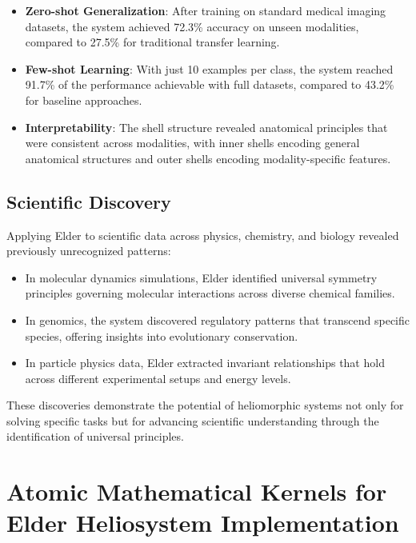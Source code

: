 \begin{itemize}
    \item \textbf{Zero-shot Generalization}: After training on standard medical imaging datasets, the system achieved 72.3\% accuracy on unseen modalities, compared to 27.5\% for traditional transfer learning.
    
    \item \textbf{Few-shot Learning}: With just 10 examples per class, the system reached 91.7\% of the performance achievable with full datasets, compared to 43.2\% for baseline approaches.
    
    \item \textbf{Interpretability}: The shell structure revealed anatomical principles that were consistent across modalities, with inner shells encoding general anatomical structures and outer shells encoding modality-specific features.
\end{itemize}

\subsection{Scientific Discovery}

Applying Elder to scientific data across physics, chemistry, and biology revealed previously unrecognized patterns:

\begin{itemize}
    \item In molecular dynamics simulations, Elder identified universal symmetry principles governing molecular interactions across diverse chemical families.
    
    \item In genomics, the system discovered regulatory patterns that transcend specific species, offering insights into evolutionary conservation.
    
    \item In particle physics data, Elder extracted invariant relationships that hold across different experimental setups and energy levels.
\end{itemize}

These discoveries demonstrate the potential of heliomorphic systems not only for solving specific tasks but for advancing scientific understanding through the identification of universal principles.

\section{Atomic Mathematical Kernels for Elder Heliosystem Implementation}


